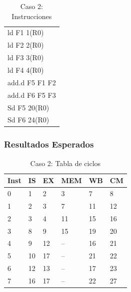 \documentclass[a4paper]{article}
\begin{document}
	\begin{table}[H]
		\centering
		\caption*{Caso 2: Instrucciones}
		\begin{tabular}{l}
			ld F1 1(R0) \\
			ld F2 2(R0) \\
			ld F3 3(R0) \\
			ld F4 4(R0) \\
			add.d F5 F1 F2 \\
			add.d F6 F5 F3 \\
			Sd F5 20(R0) \\
			Sd F6 24(R0)
		\end{tabular}
	\end{table}

	\subsubsection*{Resultados Esperados}

	\begin{table}[H]
		\centering
		\caption*{Caso 2: Tabla de ciclos}
		\begin{tabular}{|l|l|l|l|l|l|}
			\hline
			\textbf{Inst} & \textbf{IS} & \textbf{EX} & \textbf{MEM} & \textbf{WB} & \textbf{CM} \\ \hline
			0             & 1           & 2           & 3            & 7           & 8           \\ \hline
			1             & 2           & 3           & 7            & 11          & 12          \\ \hline
			2             & 3           & 4           & 11           & 15          & 16          \\ \hline
			3             & 8           & 9           & 15           & 19          & 20          \\ \hline
			4             & 9           & 12          & --           & 16          & 21          \\ \hline
			5             & 10          & 17          & --           & 21          & 22          \\ \hline
			6             & 12          & 13          & --           & 17          & 23          \\ \hline
			7             & 16          & 17          & --           & 22          & 27          \\ \hline
			\end{tabular}
	\end{table}
\end{document}
